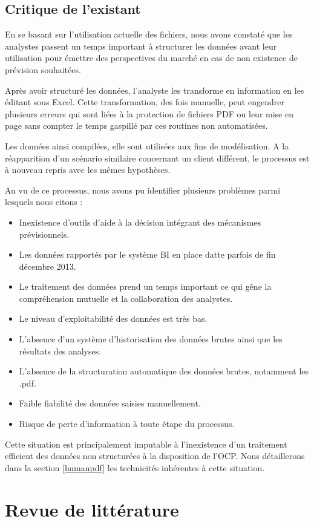 \subsection{Critique de l'existant}
En se basant sur l’utilisation actuelle des fichiers, nous avons constaté que les analystes passent un temps important à structurer les données avant leur utilisation pour émettre des perspectives du marché en cas de non existence de prévision souhaitées.
\par
Après avoir structuré les données, l’analyste les transforme en information en les éditant sous Excel. Cette transformation, des fois manuelle, peut engendrer plusieurs erreurs qui sont liées à la protection de fichiers PDF ou leur mise en page sans compter le temps gaspillé par ces routines non automatisées.
\par
Les données ainsi compilées, elle sont utilisées aux fins de modélisation. A la réapparition d'un scénario similaire concernant un client différent, le processus est à nouveau repris avec les mêmes hypothèses.
\par
Au vu de ce processus, nous avons pu identifier plusieurs problèmes parmi lesquels nous citons :
\begin{itemize}
	\item Inexistence d'outils d'aide à la décision intégrant des mécanismes prévisionnels.
	\item Les données rapportés par le système BI en place datte parfois de fin décembre 2013.
	\item Le traitement des données prend un temps important ce qui gêne la compréhension
mutuelle et la collaboration des analystes.
	\item Le niveau d'exploitabilité des données est très bas.
	\item L’absence d’un système d’historisation des données brutes ainsi que les résultats des
analyses.
	\item L’absence de la structuration automatique des données brutes, notamment les .pdf.
	\item Faible fiabilité des données saisies manuellement.
	\item Risque de perte d’information à toute étape du processus.
\end{itemize}
Cette situation est principalement imputable à l'inexistence d'un traitement efficient des données non structurées à la disposition de l'OCP. Nous détaillerons dans la section \ref{humanpdf} les technicités inhérentes à cette situation. 
\section{Revue de littérature}

